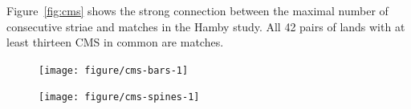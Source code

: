 \documentclass[aoas, preprint]{imsart}\usepackage[]{graphicx}\usepackage[]{color}
\newenvironment{knitrout}{}{} %
\begin{document}
Figure~\ref{fig:cms} shows the strong connection between the maximal number of consecutive striae and matches in the Hamby study. All 42 pairs of lands with at least thirteen CMS in common are matches. 
%
\begin{figure}[hbtp]
  \centering
\begin{minipage}[t]{.47\textwidth}
\begin{knitrout}
\color{fgcolor}
\texttt{[image: figure/cms-bars-1]} 

\end{knitrout}
\end{minipage}
\begin{minipage}[t]{.52\textwidth}
\begin{knitrout}
\color{fgcolor}
\texttt{[image: figure/cms-spines-1]} 


\end{knitrout}
\end{minipage}
\end{figure}
\end{document}
